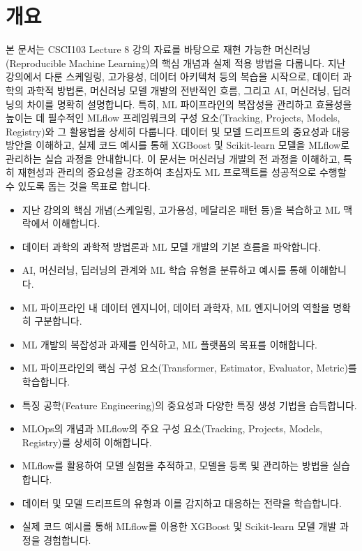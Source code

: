 \documentclass[11pt,a4paper]{article}
\theoremstyle{definition}
\begin{document}
\newpage
\section*{개요}
본 문서는 CSCI103 Lecture 8 강의 자료를 바탕으로 재현 가능한 머신러닝(Reproducible Machine Learning)의 핵심 개념과 실제 적용 방법을 다룹니다. 지난 강의에서 다룬 스케일링, 고가용성, 데이터 아키텍처 등의 복습을 시작으로, 데이터 과학의 과학적 방법론, 머신러닝 모델 개발의 전반적인 흐름, 그리고 AI, 머신러닝, 딥러닝의 차이를 명확히 설명합니다. 특히, ML 파이프라인의 복잡성을 관리하고 효율성을 높이는 데 필수적인 MLflow 프레임워크의 구성 요소(Tracking, Projects, Models, Registry)와 그 활용법을 상세히 다룹니다. 데이터 및 모델 드리프트의 중요성과 대응 방안을 이해하고, 실제 코드 예시를 통해 XGBoost 및 Scikit-learn 모델을 MLflow로 관리하는 실습 과정을 안내합니다. 이 문서는 머신러닝 개발의 전 과정을 이해하고, 특히 재현성과 관리의 중요성을 강조하여 초심자도 ML 프로젝트를 성공적으로 수행할 수 있도록 돕는 것을 목표로 합니다.

\begin{tcolorbox}[summarybox={주요 학습 목표}]
\begin{itemize}
    \item 지난 강의의 핵심 개념(스케일링, 고가용성, 메달리온 패턴 등)을 복습하고 ML 맥락에서 이해합니다.
    \item 데이터 과학의 과학적 방법론과 ML 모델 개발의 기본 흐름을 파악합니다.
    \item AI, 머신러닝, 딥러닝의 관계와 ML 학습 유형을 분류하고 예시를 통해 이해합니다.
    \item ML 파이프라인 내 데이터 엔지니어, 데이터 과학자, ML 엔지니어의 역할을 명확히 구분합니다.
    \item ML 개발의 복잡성과 과제를 인식하고, ML 플랫폼의 목표를 이해합니다.
    \item ML 파이프라인의 핵심 구성 요소(Transformer, Estimator, Evaluator, Metric)를 학습합니다.
    \item 특징 공학(Feature Engineering)의 중요성과 다양한 특징 생성 기법을 습득합니다.
    \item MLOps의 개념과 MLflow의 주요 구성 요소(Tracking, Projects, Models, Registry)를 상세히 이해합니다.
    \item MLflow를 활용하여 모델 실험을 추적하고, 모델을 등록 및 관리하는 방법을 실습합니다.
    \item 데이터 및 모델 드리프트의 유형과 이를 감지하고 대응하는 전략을 학습합니다.
    \item 실제 코드 예시를 통해 MLflow를 이용한 XGBoost 및 Scikit-learn 모델 개발 과정을 경험합니다.
\end{itemize}
\end{tcolorbox}
\end{document}
